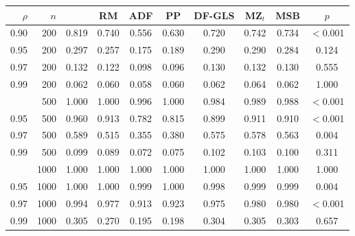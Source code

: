 \begin{tabular}{rrcccccccc}
\toprule
$\rho$ & $n$ & \RMGLS{} & RM & ADF & PP & DF-GLS & MZ$_t$ & MSB & $p$ \\
\midrule
0.90 & 200 & 0.819 & 0.740 & 0.556 & 0.630 & 0.720 & 0.742 & 0.734 & $<$0.001 \\
0.95 & 200 & 0.297 & 0.257 & 0.175 & 0.189 & 0.290 & 0.290 & 0.284 & 0.124 \\
0.97 & 200 & 0.132 & 0.122 & 0.098 & 0.096 & 0.130 & 0.132 & 0.130 & 0.555 \\
0.99 & 200 & 0.062 & 0.060 & 0.058 & 0.060 & 0.062 & 0.064 & 0.062 & 1.000 \\
\addlinespace
0.90 & 500 & 1.000 & 1.000 & 0.996 & 1.000 & 0.984 & 0.989 & 0.988 & $<$0.001 \\
0.95 & 500 & 0.960 & 0.913 & 0.782 & 0.815 & 0.899 & 0.911 & 0.910 & $<$0.001 \\
0.97 & 500 & 0.589 & 0.515 & 0.355 & 0.380 & 0.575 & 0.578 & 0.563 & 0.004 \\
0.99 & 500 & 0.099 & 0.089 & 0.072 & 0.075 & 0.102 & 0.103 & 0.100 & 0.311 \\
\addlinespace
0.90 & 1000 & 1.000 & 1.000 & 1.000 & 1.000 & 1.000 & 1.000 & 1.000 & 1.000 \\
0.95 & 1000 & 1.000 & 1.000 & 0.999 & 1.000 & 0.998 & 0.999 & 0.999 & 0.004 \\
0.97 & 1000 & 0.994 & 0.977 & 0.913 & 0.923 & 0.975 & 0.980 & 0.980 & $<$0.001 \\
0.99 & 1000 & 0.305 & 0.270 & 0.195 & 0.198 & 0.304 & 0.305 & 0.303 & 0.657 \\
\bottomrule
\end{tabular}
